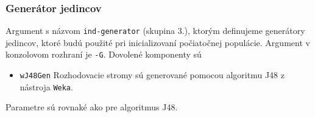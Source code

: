 \subsubsection*{Generátor jedincov}
Argument s názvom \verb|ind-generator| (skupina 3.), ktorým definujeme generátory jedincov, ktoré budú použité pri inicializovaní počiatočnej populácie. Argument v konzolovom rozhraní je \verb|-G|.
Dovolené komponenty sú 
\begin{itemize}
\item \verb|wJ48Gen| Rozhodovacie stromy sú generované pomocou algoritmu J48 z nástroja \verb|Weka|.
\end{itemize}

Parametre sú rovnaké ako pre algoritmus J48.